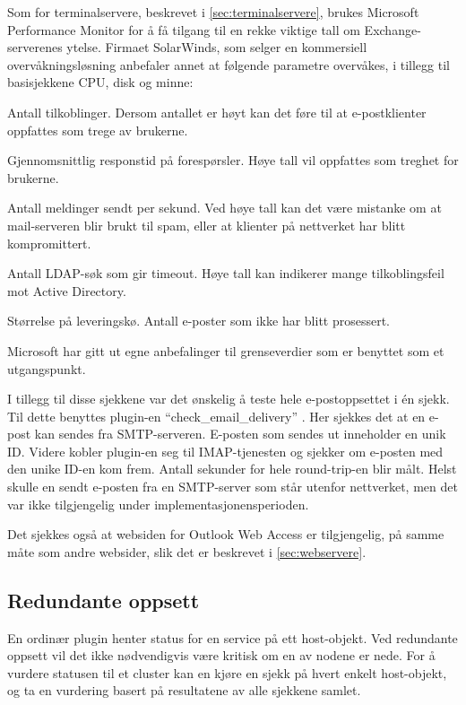 Som for terminalservere, beskrevet i \ref{sec:terminalservere}, brukes Microsoft Performance Monitor for å få tilgang til en rekke viktige tall om Exchange-serverenes ytelse. Firmaet SolarWinds, som selger en kommersiell overvåkningsløsning anbefaler annet at følgende parametre overvåkes\cite{exchange}, i tillegg til basisjekkene CPU, disk og minne:
\begin{itemize*}
	\item Antall tilkoblinger. Dersom antallet er høyt kan det føre til at e-postklienter oppfattes som trege av brukerne.
	\item Gjennomsnittlig responstid på forespørsler. Høye tall vil oppfattes som treghet for brukerne.
	\item Antall meldinger sendt per sekund. Ved høye tall kan det være mistanke om at mail-serveren blir brukt til spam, eller at klienter på nettverket har blitt kompromittert.
	\item Antall LDAP-søk som gir timeout. Høye tall kan indikerer mange tilkoblingsfeil mot Active Directory.
	\item Størrelse på leveringskø. Antall e-poster som ikke har blitt prosessert.
\end{itemize*}
Microsoft har gitt ut egne anbefalinger til grenseverdier som er benyttet som et utgangspunkt\cite{exchangethresholds}.

I tillegg til disse sjekkene var det ønskelig å teste hele e-postoppsettet i én sjekk. Til dette benyttes plugin-en ``check\_email\_delivery'' \cite{exchange}. Her sjekkes det at en e-post kan sendes fra SMTP-serveren. E-posten som sendes ut inneholder en unik ID. Videre kobler plugin-en seg til IMAP-tjenesten og sjekker om e-posten med den unike ID-en kom frem. Antall sekunder for hele round-trip-en blir målt. Helst skulle en sendt e-posten fra en SMTP-server som står utenfor nettverket, men det var ikke tilgjengelig under implementasjonensperioden.

Det sjekkes også at websiden for Outlook Web Access er tilgjengelig, på samme måte som andre websider, slik det er beskrevet i \ref{sec:webservere}.

\subsection{Redundante oppsett}
En ordinær plugin henter status for en service på ett host-objekt. Ved redundante oppsett vil det ikke nødvendigvis være kritisk om en av nodene er nede. For å vurdere statusen til et cluster kan en kjøre en sjekk på hvert enkelt host-objekt, og ta en vurdering basert på resultatene av alle sjekkene samlet.

